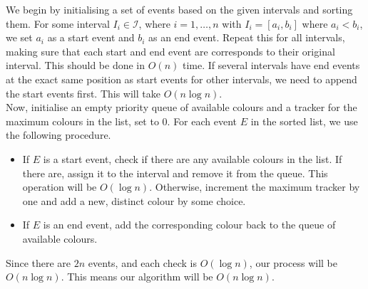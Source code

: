 \documentclass{article}
\begin{document}
\begin{solution}
We begin by initialising a set of events based on the given intervals and sorting them. For some interval $I_i \in \mathcal{I}$, where $i = 1, \dots, n$ with $I_i = [a_i, b_i]$ where $a_i < b_i$, we set $a_i$ as a start event and $b_i$ as an end event. Repeat this for all intervals, making sure that each start and end event are corresponds to their original interval. This should be done in $O(n)$ time. If several intervals have end events at the exact same position as start events for other intervals, we need to append the start events first. This will take $O(n \log n)$.\\

Now, initialise an empty priority queue of available colours and a tracker for the maximum colours in the list, set to $0$. For each event $E$ in the sorted list, we use the following procedure.

\begin{itemize}
	\item If $E$ is a start event, check if there are any available colours in the list. If there are, assign it to the interval and remove it from the queue. This operation will be $O(\log n)$. Otherwise, increment the maximum tracker by one and add a new, distinct colour by some choice.
	\item If $E$ is an end event, add the corresponding colour back to the queue of available colours.
\end{itemize}

Since there are $2n$ events, and each check is $O(\log n)$, our process will be $O(n \log n)$. This means our algorithm will be $O(n \log n)$.
\end{solution}
\end{document}

